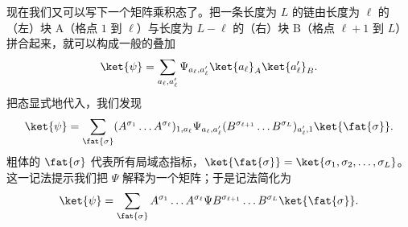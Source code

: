 现在我们又可以写下一个矩阵乘积态了。把一条长度为 $L$ 的链由长度为 $\ell$ 的（左）块 A（格点 $1$ 到 $\ell$）与长度为 $L-\ell$ 的（右）块 B（格点 $\ell+1$ 到 $L$）拼合起来，就可以构成一般的叠加
\begin{equation}
\ket{\psi} = \sum_{a_\ell, a'_\ell} \Psi_{a_\ell, a'_\ell} \ket{a_\ell}_A \ket{a'_\ell}_B .
\end{equation}
把态显式地代入，我们发现
\begin{equation}
\ket{\psi} = \sum_{\fat{\sigma}} (A^{\sigma_1} \ldots A^{\sigma_\ell})_{1,a_\ell} \Psi_{a_\ell, a'_\ell} 
 (B^{\sigma_{\ell+1}} \ldots B^{\sigma_L})_{a'_\ell,1} \ket{\fat{\sigma}} .
\end{equation}
粗体的 $\fat{\sigma}$ 代表所有局域态指标，$\ket{\fat{\sigma}} =\ket{\sigma_1,\sigma_2,\ldots,\sigma_L}$。这一记法提示我们把 $\Psi$ 解释为一个矩阵；于是记法简化为
\begin{equation}
\ket{\psi} = \sum_{\fat{\sigma}} A^{\sigma_1} \ldots A^{\sigma_\ell}\Psi
 B^{\sigma_{\ell+1}} \ldots B^{\sigma_L} \ket{\fat{\sigma}} .
 \label{eq:MPSwithPsi}
\end{equation}

